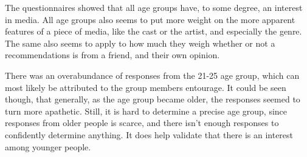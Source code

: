 The questionnaires showed that all age groups have, to some degree, an interest in media. All age groups also seems to put more weight on the more apparent features of a piece of media, like the cast or the artist, and especially the genre. The same also seems to apply to how much they weigh whether or not a recommendations is from a friend, and their own opinion.

There was an overabundance of responses from the 21-25 age group, which can most likely be attributed to the group members entourage. It could be seen though, that generally, as the age group became older, the responses seemed to turn more apathetic. Still, it is hard to determine a precise age group, since responses from older people is scarce, and there isn’t enough responses to confidently determine anything. It does help validate that there is an interest among younger people. 